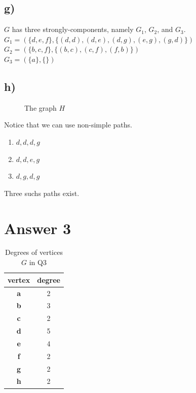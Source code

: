 \documentclass[11pt]{article}
\begin{document}
\subsection*{g)}
$G$ has three strongly-components, namely $G_1$, $G_2$, and $G_3$.\\
$G_1=(\{d,e,f\},\{(d,d),(d,e),(d,g),(e,g),(g,d)\})$\\
$G_2=(\{b,c,f\},\{(b,c),(c,f),(f,b)\})$\\
$G_3=(\{a\},\{\})$

\newpage
\subsection*{h)}
\begin{figure}[H]
	\centering
	\caption{The graph $H$}	
	\label{fig:H}
\end{figure}
Notice that we can use non-simple paths.
\begin{enumerate}
        \item $d,d,d,g$
        \item $d,d,e,g$
        \item $d,g,d,g$
\end{enumerate}
Three suchs paths exist.

\section*{Answer 3}
\begin{table}[H]
    \centering
    \begin{tabular}{cc}
        vertex & degree\\
        \hline
        \textbf{a} & 2\\
        \textbf{b} & 3\\
        \textbf{c} & 2\\
        \textbf{d} & 5\\
        \textbf{e} & 4\\
        \textbf{f} & 2\\
        \textbf{g} & 2\\
        \textbf{h} & 2\\
    \end{tabular}
    \caption{Degrees of vertices $G$ in Q3}
    \label{tab:degrees}
    
\end{table}
\end{document}
